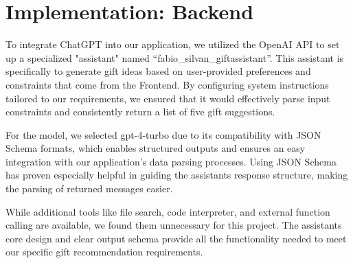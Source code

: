 \chapter{Implementation: Backend}
\label{chapter:backend}

To integrate ChatGPT into our application, we utilized the OpenAI API to set up a specialized "assistant" named ``fabio\_silvan\_giftassistant''.
This assistant is specifically to generate gift ideas based on user-provided preferences and constraints that come from the Frontend.
By configuring system instructions tailored to our requirements, we ensured that it would effectively parse input constraints and consistently return a list of five gift suggestions.

For the model, we selected gpt-4-turbo due to its compatibility with JSON Schema formats, which enables structured outputs and ensures an easy integration with our application's data parsing processes.
Using JSON Schema has proven especially helpful in guiding the assistant\textquotesingle s response structure, making the parsing of returned messages easier.

While additional tools like file search, code interpreter, and external function calling are available, we found them unnecessary for this project.
The assistant\textquotesingle s core design and clear output schema provide all the functionality needed to meet our specific gift recommendation requirements. 
